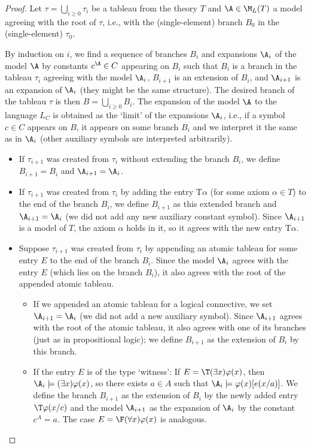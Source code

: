 \begin{proof}
    Let $\tau=\bigcup_{i\geq 0}\tau_i$ be a tableau from the theory $T$ and $\A\in\M_L(T)$ a model agreeing with the root of $\tau$, i.e., with the (single-element) branch $B_0$ in the (single-element) $\tau_0$.
    
    By induction on $i$, we find a sequence of branches $B_i$ and expansions $\A_i$ of the model $\A$ by constants $c^\A\in C$ appearing on $B_i$ such that $B_i$ is a branch in the tableau $\tau_i$ agreeing with the model $\A_i$, $B_{i+1}$ is an extension of $B_i$, and $\A_{i+1}$ is an expansion of $\A_i$ (they might be the same structure). The desired branch of the tableau $\tau$ is then $B=\bigcup_{i\geq 0}B_i$. The expansion of the model $\A$ to the language $L_C$ is obtained as the `limit' of the expansions $\A_i$, i.e., if a symbol $c\in C$ appears on $B$, it appears on some branch $B_i$ and we interpret it the same as in $\A_i$ (other auxiliary symbols are interpreted arbitrarily).
    \begin{itemize}
        \item If $\tau_{i+1}$ was created from $\tau_i$ without extending the branch $B_i$, we define $B_{i+1}=B_i$ and $\A_{i+1}=\A_{i}$.
        \item If $\tau_{i+1}$ was created from $\tau_i$ by adding the entry $\mathrm{T}\alpha$ (for some axiom $\alpha\in T$) to the end of the branch $B_i$, we define $B_{i+1}$ as this extended branch and $\A_{i+1}=\A_i$ (we did not add any new auxiliary constant symbol). Since $\A_{i+1}$ is a model of $T$, the axiom $\alpha$ holds in it, so it agrees with the new entry $\mathrm{T}\alpha$.
        \item Suppose $\tau_{i+1}$ was created from $\tau_i$ by appending an atomic tableau for some entry $E$ to the end of the branch $B_i$. Since the model $\A_i$ agrees with the entry $E$ (which lies on the branch $B_i$), it also agrees with the root of the appended atomic tableau.
        \begin{itemize}
            \item If we appended an atomic tableau for a logical connective, we set $\A_{i+1}=\A_i$ (we did not add a new auxiliary symbol). Since $\A_{i+1}$ agrees with the root of the atomic tableau, it also agrees with one of its branches (just as in propositional logic); we define $B_{i+1}$ as the extension of $B_i$ by this branch.
            \item If the entry $E$ is of the type `witness': If $E=\T(\exists x)\varphi(x)$, then $\A_i\models(\exists x)\varphi(x)$, so there exists $a\in A$ such that $\A_i\models\varphi(x)[e(x/a)]$. We define the branch $B_{i+1}$ as the extension of $B_i$ by the newly added entry $\T\varphi(x/c)$ and the model $\A_{i+1}$ as the expansion of $\A_i$ by the constant $c^A=a$. The case $E=\F(\forall x)\varphi(x)$ is analogous.

\end{itemize}
\end{itemize}
\end{proof}
